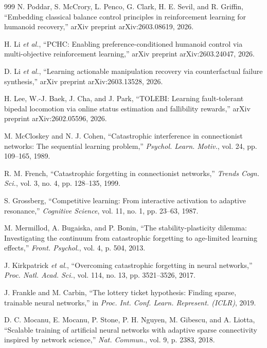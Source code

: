 \documentclass[12pt,a4paper,oneside]{report}
\begin{document}
\begin{thebibliography}{999}
N. Poddar, S. McCrory, L. Penco, G. Clark, H. E. Sevil, and R. Griffin, ``Embedding classical balance control principles in reinforcement learning for humanoid recovery,'' arXiv preprint arXiv:2603.08619, 2026.

H. Li \textit{et al.}, ``{PCHC}: Enabling preference-conditioned humanoid control via multi-objective reinforcement learning,'' arXiv preprint arXiv:2603.24047, 2026.

D. Li \textit{et al.}, ``Learning actionable manipulation recovery via counterfactual failure synthesis,'' arXiv preprint arXiv:2603.13528, 2026.

H. Lee, W.-J. Baek, J. Cha, and J. Park, ``{TOLEBI}: Learning fault-tolerant bipedal locomotion via online status estimation and fallibility rewards,'' arXiv preprint arXiv:2602.05596, 2026.

M. McCloskey and N. J. Cohen, ``Catastrophic interference in connectionist networks: The sequential learning problem,'' \textit{Psychol. Learn. Motiv.}, vol. 24, pp. 109--165, 1989.

R. M. French, ``Catastrophic forgetting in connectionist networks,'' \textit{Trends Cogn. Sci.}, vol. 3, no. 4, pp. 128--135, 1999.

S. Grossberg, ``Competitive learning: From interactive activation to adaptive resonance,'' \textit{Cognitive Science}, vol. 11, no. 1, pp. 23--63, 1987.

M. Mermillod, A. Bugaiska, and P. Bonin, ``The stability-plasticity dilemma: Investigating the continuum from catastrophic forgetting to age-limited learning effects,'' \textit{Front. Psychol.}, vol. 4, p. 504, 2013.

J. Kirkpatrick \textit{et al.}, ``Overcoming catastrophic forgetting in neural networks,'' \textit{Proc. Natl. Acad. Sci.}, vol. 114, no. 13, pp. 3521--3526, 2017.

J. Frankle and M. Carbin, ``The lottery ticket hypothesis: Finding sparse, trainable neural networks,'' in \textit{Proc. Int. Conf. Learn. Represent. (ICLR)}, 2019.

D. C. Mocanu, E. Mocanu, P. Stone, P. H. Nguyen, M. Gibescu, and A. Liotta, ``Scalable training of artificial neural networks with adaptive sparse connectivity inspired by network science,'' \textit{Nat. Commun.}, vol. 9, p. 2383, 2018.


\end{thebibliography}
\end{document}
